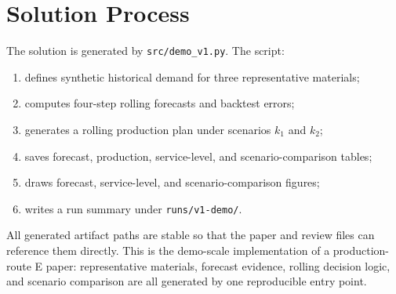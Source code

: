 \section{Solution Process}

The solution is generated by \texttt{src/demo\_v1.py}. The script:

\begin{enumerate}
  \item defines synthetic historical demand for three representative materials;
  \item computes four-step rolling forecasts and backtest errors;
  \item generates a rolling production plan under scenarios $k_1$ and $k_2$;
  \item saves forecast, production, service-level, and scenario-comparison tables;
  \item draws forecast, service-level, and scenario-comparison figures;
  \item writes a run summary under \texttt{runs/v1-demo/}.
\end{enumerate}

All generated artifact paths are stable so that the paper and review files can reference them directly. This is the demo-scale implementation of a production-route E paper: representative materials, forecast evidence, rolling decision logic, and scenario comparison are all generated by one reproducible entry point.
